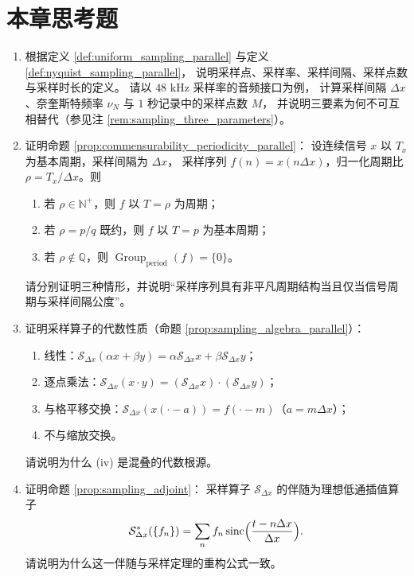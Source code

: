 \section*{本章思考题}

\begin{enumerate}[leftmargin=3em, label=\textbf{题 \arabic*}]
    \item 根据定义 \ref{def:uniform_sampling_parallel} 与定义 \ref{def:nyquist_sampling_parallel}，
    说明采样点、采样率、采样间隔、采样点数与采样时长的定义。
    请以 $48$ kHz 采样率的音频接口为例，
    计算采样间隔 $\Delta x$、奈奎斯特频率 $\nu_N$ 与 $1$ 秒记录中的采样点数 $M$，
    并说明三要素为何不可互相替代（参见注 \ref{rem:sampling_three_parameters}）。

    \item 证明命题 \ref{prop:commensurability_periodicity_parallel}：
    设连续信号 $x$ 以 $T_x$ 为基本周期，采样间隔为 $\Delta x$，
    采样序列 $f(n)=x(n\Delta x)$，归一化周期比 $\rho=T_x/\Delta x$。则
    \begin{enumerate}[label=(\roman*)]
        \item 若 $\rho\in\mathbb{N}^+$，则 $f$ 以 $T=\rho$ 为周期；
        \item 若 $\rho=p/q$ 既约，则 $f$ 以 $T=p$ 为基本周期；
        \item 若 $\rho\notin\mathbb{Q}$，则 $\operatorname{Group}_{\mathrm{period}}(f)=\{0\}$。
    \end{enumerate}
    请分别证明三种情形，并说明“采样序列具有非平凡周期结构当且仅当信号周期与采样间隔公度”。

    \item 证明采样算子的代数性质（命题 \ref{prop:sampling_algebra_parallel}）：
    \begin{enumerate}[label=(\roman*)]
        \item 线性：$\mathcal{S}_{\Delta x}(\alpha x+\beta y)
              =\alpha\mathcal{S}_{\Delta x}x+\beta\mathcal{S}_{\Delta x}y$；
        \item 逐点乘法：$\mathcal{S}_{\Delta x}(x\cdot y)
              =(\mathcal{S}_{\Delta x}x)\cdot(\mathcal{S}_{\Delta x}y)$；
        \item 与格平移交换：$\mathcal{S}_{\Delta x}(x(\cdot-a))=f(\cdot-m)$（$a=m\Delta x$）；
        \item 不与缩放交换。
    \end{enumerate}
    请说明为什么 (iv) 是混叠的代数根源。

    \item 证明命题 \ref{prop:sampling_adjoint}：
    采样算子 $\mathcal{S}_{\Delta x}$ 的伴随为理想低通插值算子
    \[
    \mathcal{S}_{\Delta x}^*(\{f_n\})
    =\sum_n f_n\operatorname{sinc}
    \Bigl(\frac{t-n\Delta x}{\Delta x}\Bigr).
    \]
    请说明为什么这一伴随与采样定理的重构公式一致。


\end{enumerate}
